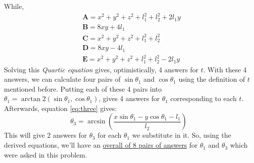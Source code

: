 \documentclass[conference]{IEEEtran}
\begin{document}
While,
\begin{align*}
     & \mathbf{A} = x^2 + y^2 + z^2 + l_1 ^2 + l_2 ^2 + 2 l_1 y \\
     & \mathbf{B} = 8 x y + 4 l_1                               \\
     & \mathbf{C} = x^2 + y^2 + z^2 + l_1 ^2 + l_2 ^2           \\
     & \mathbf{D} = 8 x y - 4 l_1                               \\
     & \mathbf{E} = x^2 + y^2 + z^2 + l_1 ^2 + l_2 ^2 - 2 l_1 y
\end{align*}
Solving this \textit{Quartic equation} gives, optimistically, 4 answers for $t$. With these 4 answers, we can calculate four pairs of $\sin \theta_1$ and $\cos \theta_1$ using the definition of $t$ mentioned before. Putting each of these 4 pairs into $\theta_1 = \arctan2(\sin \theta_1, \cos \theta_1)$, gives 4 answers for $\theta_1$ corresponding to each $t$. Afterwards, equation \ref{eq:three} gives:
$$
    \theta_3 = \arcsin \left(\frac{x \sin \theta_1 - y \cos \theta_1 - l_1}{l_2}\right)
$$
This will give 2 answers for $\theta_3$ for each $\theta_1$ we substitute in it. So, using the derived equations, we'll have an \underline{overall of 8 pairs of answers} for $\theta_1$ and $\theta_3$ which were asked in this problem.
\end{document}
